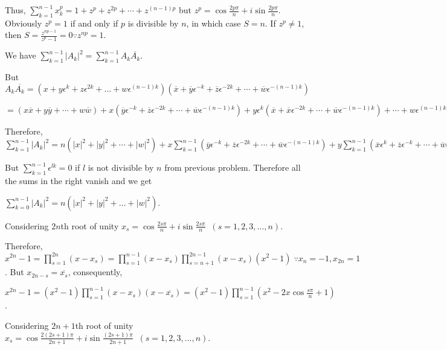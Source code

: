  Thus, $\displaystyle\sum_{k = 1}^{n - 1}x_k^p = 1 + z^p + z^{2p} + \cdots + z^{(n - 1)p}$ but $z^p =
  \cos\frac{2p\pi}{n} + i\sin\frac{2p\pi}{n}$. Obviously $z^p = 1$ if and only if $p$ is divisible by $n$,
  in which case $S = n$. If $z^p\neq 1$, then $S = \frac{z^{np - 1}}{z^p - 1} = 0\because z^{np} = 1$.
\item We have $\displaystyle\sum_{k=1}^{n - 1}|A_k|^2 = \sum_{k=1}^{n - 1}A_k\overline{A_k}$.

  But $A_k\overline{A_k} = (x + y\epsilon^k + z\epsilon^{2k} + \ldots + w\epsilon^{(n - 1)k})(\overline{x} +
  \overline{y}\epsilon^{-k} + \overline{z}\epsilon^{-2k} + \cdots + \overline{w}\epsilon^{-(n - 1)k})$

  $= (x\overline{x} + y\overline{y} + \cdots + w\overline{w})+ x(\overline{y}\epsilon^{-k} +
  \overline{z}\epsilon^{-2k} + \cdots + \overline{w}\epsilon^{-(n - 1)k}) + y\epsilon^k(\overline{x} +
  \overline{x}\epsilon^{-2k} + \cdots + \overline{w}\epsilon^{-(n - 1)k}) + \cdots + w\epsilon^{(n -
    1)k}(\overline{x} + \overline{y}\epsilon^{-k} + \cdots + \overline{u}\epsilon^{-(n - 2)k})$

  Therefore, $\displaystyle\sum_{k=1}^{n - 1}|A_k|^2 = n(|x|^2 + |y|^2 + \cdots + |w|^2) + x\sum_{k=1}^{n -
    1}(\overline{y}\epsilon^{-k} + \overline{z}\epsilon^{-2k} + \cdots + \overline{w}\epsilon^{-(n - 1)k}) +
  y\sum_{k=1}^{n - 1}(\overline{x}\epsilon^k + \overline{z}\epsilon^{-k} + \cdots +
  \overline{w}\epsilon^{-(n - 2)k}) + \cdots + w\sum_{k = 1}^{n - 1}(\overline{x}\epsilon^{(n - 1)k}+
  \overline{y}\epsilon^{(n - 2)k} + \cdots + \overline{u}\epsilon^k)$

  But $\displaystyle\sum_{k=1}^{n - 1}\epsilon^{lk} = 0$ if $l$ is not divisible by $n$ from previous
  problem. Therefore all the sums in the right vanish and we get

  $\displaystyle\sum_{k = 0}^{n - 1}|A_k|^2 = n(|x|^2 + |y|^2 + \ldots + |w|^2)$.
\item Considering $2n$th root of unity $x_s = \cos\frac{2s\pi}{n} + i\sin\frac{2s\pi}{n}\;\;(s = 1, 2, 3,
  \ldots, n)$.

  Therefore, $x^{2n} - 1 = \displaystyle\prod_{s=1}^{2n}(x - x_s) = \prod_{s=1}^{n - 1}(x - x_s)
  \prod_{s=n + 1}^{2n - 1}(x - x_s)(x^2 - 1)\;\because x_n = -1, x_{2n} = 1$. But $x_{2n - s} =
  \overline{x_s}$, consequently,

  $x^{2n} - 1 = (x^2 - 1)\displaystyle\prod_{s = 1}^{n - 1}(x - x_s)(x - \overline{x_s}) = (x^2 - 1)\prod_{s
    = 1}^{n - 1}(x^2 - 2x\cos\frac{s\pi}{n} + 1)$.
\item Considering $2n + 1$th root of unity $x_s = \cos\frac{2(2s + 1)\pi}{2n + 1} + i\sin\frac{(2s +
  1)\pi}{2n + 1}\;\;(s = 1, 2, 3, \ldots, n)$.

